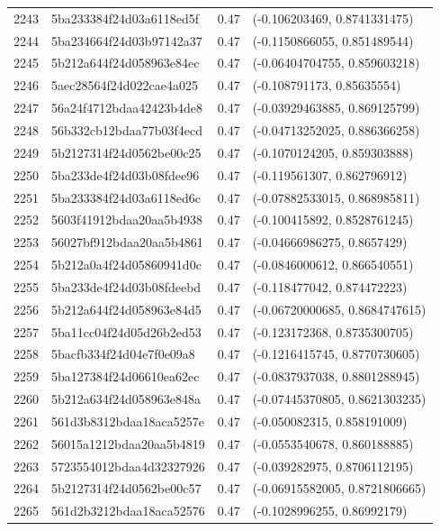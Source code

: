 \begin{table}[ht]
\begin{tabular}{rlrl}
  2243 & 5ba233384f24d03a6118ed5f & 0.47 & (-0.106203469, 0.8741331475) \\ 
  2244 & 5ba234664f24d03b97142a37 & 0.47 & (-0.1150866055, 0.851489544) \\ 
  2245 & 5b212a644f24d058963e84ec & 0.47 & (-0.06404704755, 0.859603218) \\ 
  2246 & 5aec28564f24d022cae4a025 & 0.47 & (-0.108791173, 0.85635554) \\ 
  2247 & 56a24f4712bdaa42423b4de8 & 0.47 & (-0.03929463885, 0.869125799) \\ 
  2248 & 56b332cb12bdaa77b03f4ecd & 0.47 & (-0.04713252025, 0.886366258) \\ 
  2249 & 5b2127314f24d0562be00c25 & 0.47 & (-0.1070124205, 0.859303888) \\ 
  2250 & 5ba233de4f24d03b08fdee96 & 0.47 & (-0.119561307, 0.862796912) \\ 
  2251 & 5ba233384f24d03a6118ed6c & 0.47 & (-0.07882533015, 0.868985811) \\ 
  2252 & 5603f41912bdaa20aa5b4938 & 0.47 & (-0.100415892, 0.8528761245) \\ 
  2253 & 56027bf912bdaa20aa5b4861 & 0.47 & (-0.04666986275, 0.8657429) \\ 
  2254 & 5b212a0a4f24d05860941d0c & 0.47 & (-0.0846000612, 0.866540551) \\ 
  2255 & 5ba233de4f24d03b08fdeebd & 0.47 & (-0.118477042, 0.874472223) \\ 
  2256 & 5b212a644f24d058963e84d5 & 0.47 & (-0.06720000685, 0.8684747615) \\ 
  2257 & 5ba11cc04f24d05d26b2ed53 & 0.47 & (-0.123172368, 0.8735300705) \\ 
  2258 & 5bacfb334f24d04e7f0e09a8 & 0.47 & (-0.1216415745, 0.8770730605) \\ 
  2259 & 5ba127384f24d06610ea62ec & 0.47 & (-0.0837937038, 0.8801288945) \\ 
  2260 & 5b212a634f24d058963e848a & 0.47 & (-0.07445370805, 0.8621303235) \\ 
  2261 & 561d3b8312bdaa18aca5257e & 0.47 & (-0.050082315, 0.858191009) \\ 
  2262 & 56015a1212bdaa20aa5b4819 & 0.47 & (-0.0553540678, 0.860188885) \\ 
  2263 & 5723554012bdaa4d32327926 & 0.47 & (-0.039282975, 0.8706112195) \\ 
  2264 & 5b2127314f24d0562be00c57 & 0.47 & (-0.06915582005, 0.8721806665) \\ 
  2265 & 561d2b3212bdaa18aca52576 & 0.47 & (-0.1028996255, 0.86992179) \\ 

\end{tabular}
\end{table}
